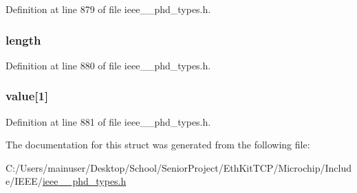Definition at line 879 of file ieee\+\_\+\_\+phd\+\_\+types.\+h.

\hypertarget{struct___observation_scan_list_a3743679e4ff85e3e1b3fc2e59973fbb3}{}
\subsubsection[{length}]{ length}\label{struct___observation_scan_list_a3743679e4ff85e3e1b3fc2e59973fbb3}


Definition at line 880 of file ieee\+\_\+\_\+phd\+\_\+types.\+h.

\hypertarget{struct___observation_scan_list_ab21069b7802894255681620a1188de4e}{}
\subsubsection[{value}]{ value\mbox{[}1\mbox{]}}\label{struct___observation_scan_list_ab21069b7802894255681620a1188de4e}


Definition at line 881 of file ieee\+\_\+\_\+phd\+\_\+types.\+h.



The documentation for this struct was generated from the following file\+:\begin{DoxyCompactItemize}
\item 
C\+:/\+Users/mainuser/\+Desktop/\+School/\+Senior\+Project/\+Eth\+Kit\+T\+C\+P/\+Microchip/\+Include/\+I\+E\+E\+E/\hyperlink{ieee__11073__phd__types_8h}{ieee\+\_\+\_\+phd\+\_\+types.\+h}\end{DoxyCompactItemize}

